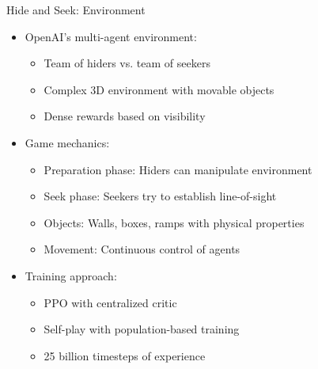 \documentclass[10pt]{beamer}
\begin{document}
\begin{frame}{Hide and Seek: Environment}
    \begin{itemize}
        \item OpenAI's multi-agent environment:
        \begin{itemize}
            \item Team of hiders vs. team of seekers
            \item Complex 3D environment with movable objects
            \item Dense rewards based on visibility
        \end{itemize}
        \vspace{0.3cm}
        \item Game mechanics:
        \begin{itemize}
            \item Preparation phase: Hiders can manipulate environment
            \item Seek phase: Seekers try to establish line-of-sight
            \item Objects: Walls, boxes, ramps with physical properties
            \item Movement: Continuous control of agents
        \end{itemize}
        \vspace{0.3cm}
        \item Training approach:
        \begin{itemize}
            \item PPO with centralized critic
            \item Self-play with population-based training
            \item 25 billion timesteps of experience
        \end{itemize}
    \end{itemize}
\end{frame}

\end{document}
